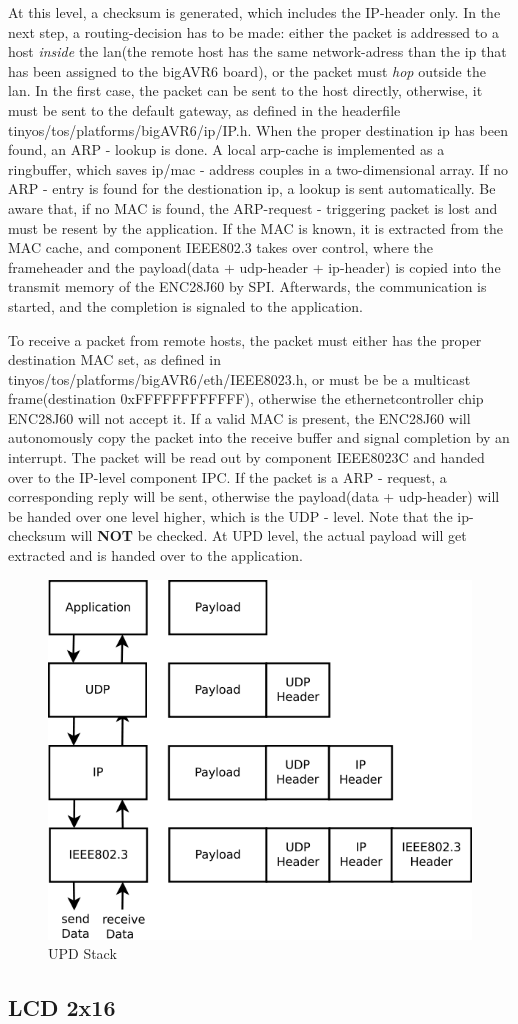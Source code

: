 At this level, a checksum is generated, which includes the IP-header only. In the next step, a routing-decision has to be made: either the packet is addressed to a host \textit{inside} the lan(the remote host has the same network-adress than the ip that has been assigned to the bigAVR6 board), or the packet must \textit{hop} outside the lan. In the first case, the packet can be sent to the host directly, otherwise, it must be sent to the default gateway, as defined in the headerfile tinyos/tos/platforms/bigAVR6/ip/IP.h. When the proper destination ip has been found, an ARP - lookup is done. A local arp-cache is implemented as a ringbuffer, which saves ip/mac - address couples in a two-dimensional array. If no ARP - entry is found for the destionation ip, a lookup is sent automatically. Be aware that, if no MAC is found, the ARP-request - triggering packet is lost and must be resent by the application. If the MAC is known, it is extracted from the MAC cache, and component IEEE802.3 takes over control, where the frameheader and the payload(data + udp-header + ip-header) is copied into the transmit memory of the ENC28J60 by SPI. Afterwards, the communication is started, and the completion is signaled to the application.

To receive a packet from remote hosts, the packet must either has the proper destination MAC set, as defined in tinyos/tos/platforms/bigAVR6/eth/IEEE8023.h, or must be be a multicast frame(destination 0xFFFFFFFFFFFF), otherwise the ethernetcontroller chip ENC28J60 will not accept it. If a valid MAC is present, the ENC28J60 will autonomously copy the packet into the receive buffer and signal completion by an interrupt. The packet will be read out by component IEEE8023C and handed over to the IP-level component IPC. If the packet is a ARP - request, a corresponding reply will be sent, otherwise the payload(data + udp-header) will be handed over one level higher, which is the UDP - level. Note that the ip-checksum will \textbf{NOT} be checked. At UPD level, the actual payload will get extracted and is handed over to the application.

\begin{figure}[h]
 \centerline{\includegraphics[width=.8\columnwidth]{pics/udpstack.png}}
  \caption{UPD Stack}
  \label{fig:udpstack}
\end{figure}

\subsection{LCD 2x16}



